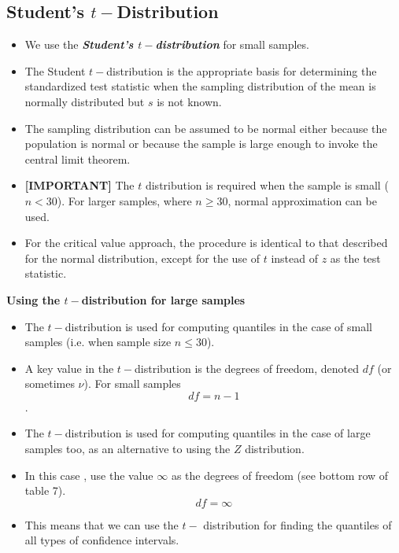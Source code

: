 \documentclass[]{report}
\begin{document}
\subsection{Student's $t-$Distribution}
\begin{itemize} 
\item We use the \textbf{\textit{Student's $t-$distribution}} for small samples.
\item The Student $t-$distribution is the appropriate basis for
determining the standardized test statistic when the sampling
distribution of the mean is normally distributed but $s$ is not
known. 
\item The sampling distribution can be assumed to be normal
either because the population is normal or because the sample is
large enough to invoke the central limit theorem. 
\item \textbf{[IMPORTANT]} The $t$
distribution is required when the sample is small ($n < 30$). For
larger samples, where $n \geq 30$, normal approximation can be used. 
\item For the critical
value approach, the procedure is identical to that described  for the normal distribution, except for the use of $t$
instead of $z$ as the test statistic.
\end{itemize}



\textbf{Using the $t-$distribution for large samples}

\begin{itemize}
\item The $t-$distribution is used for computing quantiles in the case of small samples (i.e. when sample size $n \leq 30$).
\item A key value in the $t-$distribution is the degrees of freedom, denoted $df$ (or sometimes $\nu$). For small samples \[ df= n-1\].
\item The $t-$distribution is used for computing quantiles in the case of large samples too, as an alternative to using the $Z$ distribution.
\item In this case , use the value $\infty$ as the degrees of freedom (see bottom row of table 7).
\[ df= \infty\]
\item This means that we can use the $t-$ distribution for finding the quantiles of all types of confidence intervals.

\end{itemize}
\end{document}
